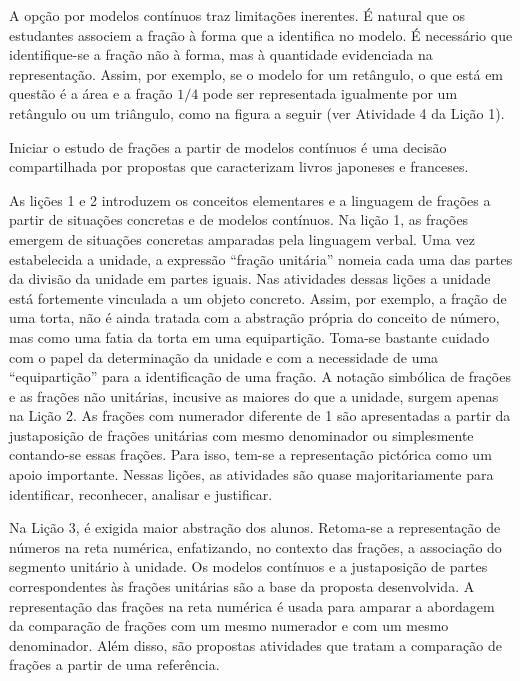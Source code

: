 A opção por modelos contínuos traz limitações inerentes. É natural que os estudantes associem a fração à forma que a identifica no modelo. É necessário que identifique-se a fração não à forma, mas à quantidade evidenciada na representação. Assim, por exemplo, se o modelo for um retângulo, o que está em questão é a área e a fração $1/4$ pode ser representada igualmente por um retângulo ou um triângulo, como na figura a seguir (ver Atividade 4 da Lição 1).

Iniciar o estudo de frações a partir de modelos contínuos é uma decisão compartilhada por propostas que caracterizam livros japoneses e franceses.

\begin{center}
\end{center}

As lições 1 e 2 introduzem os conceitos elementares e a linguagem de frações a partir de situações concretas e de modelos contínuos. Na lição 1, as frações emergem de situações concretas amparadas pela linguagem verbal. Uma vez estabelecida a unidade, a expressão ``fração unitária'' nomeia cada uma das partes da divisão da unidade em partes iguais. Nas atividades dessas lições a unidade está fortemente vinculada a um objeto concreto. Assim, por exemplo, a fração de uma torta, não é ainda tratada com a abstração própria do conceito de número, mas como uma fatia da torta em uma equipartição. Toma-se bastante cuidado com o papel da determinação da unidade e com a necessidade de uma ``equipartição'' para a identificação de uma fração. A notação simbólica de frações e as frações não unitárias, incusive as maiores do que a unidade, surgem apenas na Lição 2. As frações com numerador diferente de 1 são apresentadas a partir da justaposição de frações unitárias com mesmo denominador ou simplesmente contando-se essas frações. Para isso, tem-se a representação pictórica como um apoio importante. Nessas lições, as atividades são quase majoritariamente para identificar, reconhecer, analisar e justificar.

Na Lição 3, é exigida maior abstração dos alunos. Retoma-se a representação de números na reta numérica, enfatizando, no contexto das frações, a associação do segmento unitário à unidade. Os modelos contínuos e a justaposição de partes correspondentes às frações unitárias são a base da proposta desenvolvida. A representação das frações na reta numérica é usada para amparar a abordagem da comparação de frações com um mesmo numerador e com um mesmo denominador. Além disso, são propostas atividades que tratam a comparação de frações a partir de uma referência.

